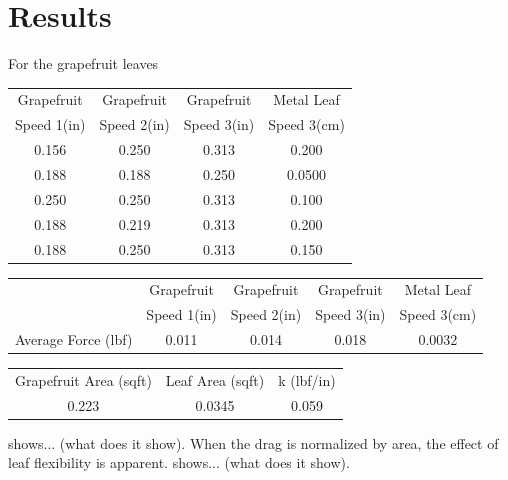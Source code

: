 \documentclass{article}
\begin{document}
\section{Results}
For the grapefruit leaves 

\begin{tabular}{|c|c|c|c|}
     Grapefruit & Grapefruit & Grapefruit & Metal Leaf \\
     Speed 1(in) & Speed 2(in) & Speed 3(in) & Speed 3(cm) \\ 
     0.156 & 0.250 & 0.313 & 0.200 \\
     0.188 & 0.188 & 0.250 & 0.0500 \\
     0.250 & 0.250 & 0.313 & 0.100 \\
     0.188 & 0.219 & 0.313 & 0.200 \\
     0.188 & 0.250 & 0.313 & 0.150 \\
\end{tabular}

\begin{tabular}{|c|c|c|c|c|}
 & Grapefruit & Grapefruit & Grapefruit & Metal Leaf \\
 & Speed 1(in) & Speed 2(in) & Speed 3(in) & Speed 3(cm) \\
Average Force (lbf)	& 0.011 & 0.014 & 0.018 & 0.0032\\
\end{tabular}

\begin{tabular}{|c|c|c|}
Grapefruit Area (sqft) & Leaf Area (sqft) & k (lbf/in) \\
0.223 & 0.0345 & 0.059\\
\end{tabular}




 shows... (what does it show). When the drag is normalized by area, the effect of leaf flexibility is apparent.  shows... (what does it show). 
\end{document}
